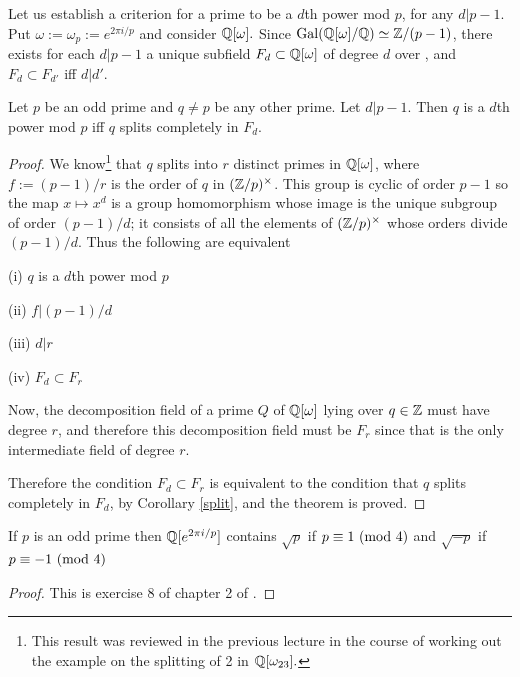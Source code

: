 \documentclass[10pt,a4paper]{amsart}
\begin{document}
Let us establish a criterion for a prime to be a $d$th power mod $p$, for any
$d|p-1$. Put $\omega := \omega_p := e^{2\pi i/p}$ and consider $\mathbb{Q}[\omega].$
Since $\mathrm{Gal}(\mathbb{Q}[\omega]/\mathbb{Q}) \simeq \mathbb{Z}/(p-1)$, there exists for each $d|p-1$ a
unique subfield $F_d \subset \mathbb{Q}[\omega]$ of degree $d$ over \Q{}, and $F_d
\subset F_{d'}$ iff $d|d'$.

\begin{thm}\label{fdsplit}
Let $p$ be an odd prime and $q\neq p$ be any other prime. Let $d| p-1$. Then
$q$ is a $d$th power mod $p$ iff $q$ splits completely in $F_d$.
\end{thm}

\begin{proof}
We know\footnote{This result was reviewed in the previous lecture in the course
of working out the example on the splitting of 2 in $\mathbb{Q}[\omega_{23}].$} that
$q$ splits into $r$ distinct primes in $\mathbb{Q}[\omega]$, where $f := (p-1)/r$ is
the order of $q$ in $(\mathbb{Z}/p)^\times$. This group is cyclic of order $p-1$ so
the map $x \mapsto x^d$ is a group homomorphism whose image is the unique
subgroup of order $(p-1)/d$; it consists of all the elements of
$(\mathbb{Z}/p)^\times$ whose orders divide $(p-1)/d$. Thus the following are
equivalent

(i) $q$ is a $d$th power mod $p$

(ii) $f|(p-1)/d$

(iii) $d|r$

(iv) $F_d \subset F_r$

Now, the decomposition field of a prime $Q$ of $\mathbb{Q}[\omega]$ lying over $q\in
\mathbb{Z}$ must have degree $r$, and therefore this decomposition field must be $F_r$
since that is the only intermediate field of degree $r$.

Therefore the condition $F_d \subset F_r$ is equivalent to the condition that
$q$ splits completely in $F_d$, by Corollary \ref{split}, and the theorem is
proved.
\end{proof}

\begin{lem}
If $p$ is an odd prime then $\mathbb{Q}[e^{2\pi i/p}]$ contains $\sqrt{p}$ if $p \equiv
1 \text{ } (\mathrm{mod}\text{ } 4)$ and $\sqrt{-p}$ if $p\equiv -1 \text{ } (\mathrm{mod}\text{ } 4)$
\end{lem}
\begin{proof} This is exercise 8 of chapter 2 of \cite{M}.
\end{proof}
\end{document}
